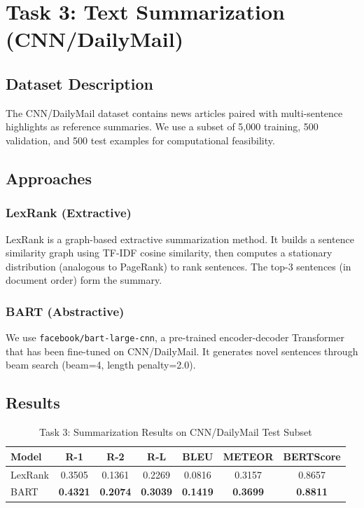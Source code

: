 \documentclass[12pt, a4paper]{article}
\begin{document}
\section{Task 3: Text Summarization (CNN/DailyMail)}

\subsection{Dataset Description}

The CNN/DailyMail dataset contains news articles paired with multi-sentence highlights as reference summaries. We use a subset of 5,000 training, 500 validation, and 500 test examples for computational feasibility.

\subsection{Approaches}

\subsubsection{LexRank (Extractive)}
LexRank is a graph-based extractive summarization method. It builds a sentence similarity graph using TF-IDF cosine similarity, then computes a stationary distribution (analogous to PageRank) to rank sentences. The top-3 sentences (in document order) form the summary.

\subsubsection{BART (Abstractive)}
We use \texttt{facebook/bart-large-cnn}, a pre-trained encoder-decoder Transformer that has been fine-tuned on CNN/DailyMail. It generates novel sentences through beam search (beam=4, length penalty=2.0).

\subsection{Results}

\begin{table}[H]
\centering
\caption{Task 3: Summarization Results on CNN/DailyMail Test Subset}
\label{tab:task3_results}
\begin{tabular}{lcccccc}
\toprule
\textbf{Model} & \textbf{R-1} & \textbf{R-2} & \textbf{R-L} & \textbf{BLEU} & \textbf{METEOR} & \textbf{BERTScore} \\
\midrule
LexRank & 0.3505 & 0.1361 & 0.2269 & 0.0816 & 0.3157 & 0.8657 \\
BART & \textbf{0.4321} & \textbf{0.2074} & \textbf{0.3039} & \textbf{0.1419} & \textbf{0.3699} & \textbf{0.8811} \\
\bottomrule
\end{tabular}
\end{table}
\end{document}
